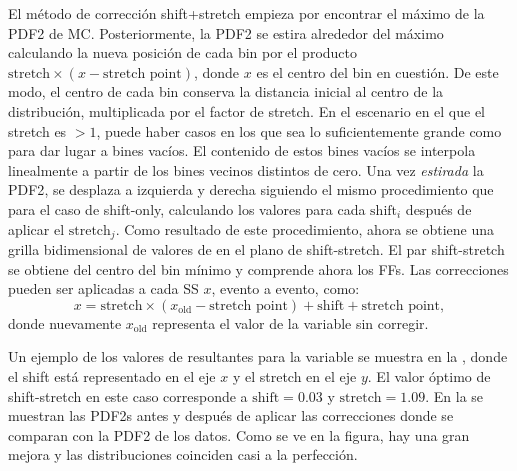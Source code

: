El método de corrección shift+stretch empieza por encontrar el máximo de la \ac{PDF2} de \ac{MC}. Posteriormente, la \ac{PDF2} se estira alrededor del máximo calculando la nueva posición de cada bin por el producto \(\text{stretch}\times (x - \text{stretch point})\), donde \(x\) es el centro del bin en cuestión. De este modo, el centro de cada bin conserva la distancia inicial al centro de la distribución, multiplicada por el factor de stretch. En el escenario en el que el stretch es \(>1\), puede haber casos en los que sea lo suficientemente grande como para dar lugar a bines vacíos. El contenido de estos bines vacíos se interpola linealmente a partir de los bines vecinos distintos de cero.
Una vez \textit{estirada} la \ac{PDF2}, se desplaza a izquierda y derecha siguiendo el mismo procedimiento que para el caso de shift-only, calculando los valores \chisq para cada \(\text{shift}_i\) después de aplicar el \(\text{stretch}_j\). Como resultado de este procedimiento, ahora se obtiene una grilla bidimensional de valores de \chisq en el plano de shift-stretch. El par shift-stretch se obtiene del centro del bin mínimo y comprende ahora los \acp{FF}. Las correcciones pueden ser aplicadas a cada \ac{SS} \(x\), evento a evento, como:
\begin{equation}
	x = \text{stretch}\times(x_{\text{old}} - \text{stretch point}) + \text{shift} + \text{stretch point},
\end{equation}
donde nuevamente \(x_\text{old}\) representa el valor de la variable sin corregir.

Un ejemplo de los valores de \chisq resultantes para la variable \fside se muestra en la \Fig{\ref{fig:ss_corrections:ffs:calculation:fside_calculation:chi2}}, donde el shift está representado en el eje \(x\) y el stretch en el eje \(y\). El valor óptimo de shift-stretch en este caso corresponde a \(\text{shift}=0.03\) y \(\text{stretch}=1.09\). En la \Fig{\ref{fig:ss_corrections:ffs:calculation:fside_calculation:pdfs}} se muestran las \acp{PDF2} antes y después de aplicar las correcciones donde se comparan con la \ac{PDF2} de los datos. Como se ve en la figura, hay una gran mejora y las distribuciones coinciden casi a la perfección.

